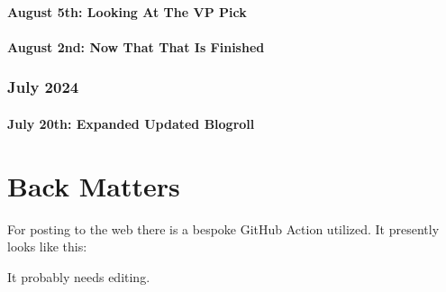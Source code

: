 \documentclass[12pt,letterpaper]{report}
\begin{document}
\subsection{August 5th: Looking At The VP Pick}

\subsection{August 2nd: Now That That Is Finished}

\section{July 2024}
\subsection{July 20th: Expanded Updated Blogroll}

\part{Back Matters}
For posting to the web there is a bespoke GitHub Action utilized.  It presently looks like this:



It probably needs editing.
\end{document}
